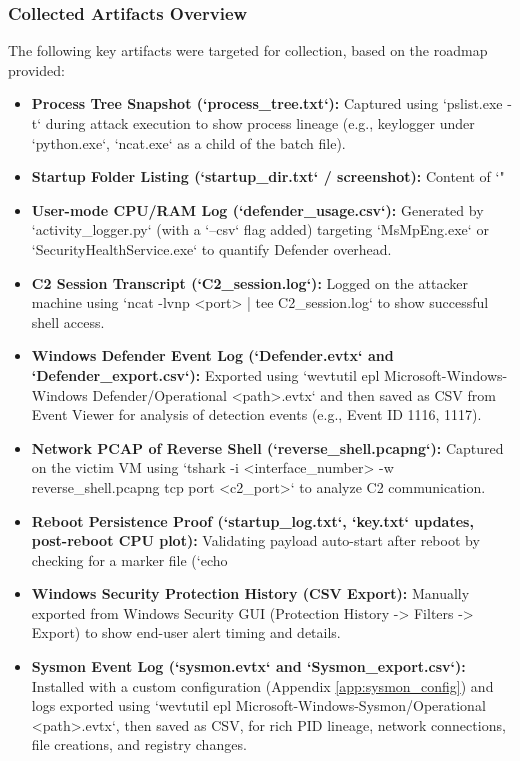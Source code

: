 \documentclass[11pt]{article}
\begin{document}
	\subsubsection{Collected Artifacts Overview}
	The following key artifacts were targeted for collection, based on the roadmap provided:
	\begin{itemize}
		\item \textbf{Process Tree Snapshot (`process_tree.txt`):} Captured using `pslist.exe -t` during attack execution to show process lineage (e.g., keylogger under `python.exe`, `ncat.exe` as a child of the batch file).
		\item \textbf{Startup Folder Listing (`startup_dir.txt` / screenshot):} Content of `"%
		\item \textbf{User-mode CPU/RAM Log (`defender_usage.csv`):} Generated by `activity_logger.py` (with a `--csv` flag added) targeting `MsMpEng.exe` or `SecurityHealthService.exe` to quantify Defender overhead.
		\item \textbf{C2 Session Transcript (`C2_session.log`):} Logged on the attacker machine using `ncat -lvnp <port> | tee C2_session.log` to show successful shell access.
		\item \textbf{Windows Defender Event Log (`Defender.evtx` and `Defender_export.csv`):} Exported using `wevtutil epl Microsoft-Windows-Windows Defender/Operational <path>\Defender.evtx` and then saved as CSV from Event Viewer for analysis of detection events (e.g., Event ID 1116, 1117).
		\item \textbf{Network PCAP of Reverse Shell (`reverse_shell.pcapng`):} Captured on the victim VM using `tshark -i <interface_number> -w reverse_shell.pcapng tcp port <c2_port>` to analyze C2 communication.
		\item \textbf{Reboot Persistence Proof (`startup_log.txt`, `key.txt` updates, post-reboot CPU plot):} Validating payload auto-start after reboot by checking for a marker file (`echo %
		\item \textbf{Windows Security Protection History (CSV Export):} Manually exported from Windows Security GUI (Protection History -> Filters -> Export) to show end-user alert timing and details.
		\item \textbf{Sysmon Event Log (`sysmon.evtx` and `Sysmon_export.csv`):} Installed with a custom configuration (Appendix \ref{app:sysmon_config}) and logs exported using `wevtutil epl Microsoft-Windows-Sysmon/Operational <path>\sysmon.evtx`, then saved as CSV, for rich PID lineage, network connections, file creations, and registry changes.
	\end{itemize}
	
\end{document}
